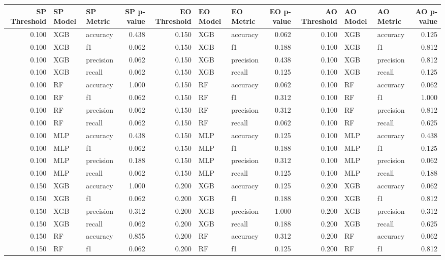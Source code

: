 \begin{tabular}{rllrrllrrllr}
\toprule
SP Threshold & SP Model & SP Metric & SP p-value & EO Threshold & EO Model & EO Metric & EO p-value & AO Threshold & AO Model & AO Metric & AO p-value \\
\midrule
0.100 & XGB & accuracy & 0.438 & 0.150 & XGB & accuracy & 0.062 & 0.100 & XGB & accuracy & 0.125 \\
0.100 & XGB & f1 & 0.062 & 0.150 & XGB & f1 & 0.188 & 0.100 & XGB & f1 & 0.812 \\
0.100 & XGB & precision & 0.062 & 0.150 & XGB & precision & 0.438 & 0.100 & XGB & precision & 0.812 \\
0.100 & XGB & recall & 0.062 & 0.150 & XGB & recall & 0.125 & 0.100 & XGB & recall & 0.125 \\
0.100 & RF & accuracy & 1.000 & 0.150 & RF & accuracy & 0.062 & 0.100 & RF & accuracy & 0.062 \\
0.100 & RF & f1 & 0.062 & 0.150 & RF & f1 & 0.312 & 0.100 & RF & f1 & 1.000 \\
0.100 & RF & precision & 0.062 & 0.150 & RF & precision & 0.312 & 0.100 & RF & precision & 0.812 \\
0.100 & RF & recall & 0.062 & 0.150 & RF & recall & 0.062 & 0.100 & RF & recall & 0.625 \\
0.100 & MLP & accuracy & 0.438 & 0.150 & MLP & accuracy & 0.125 & 0.100 & MLP & accuracy & 0.438 \\
0.100 & MLP & f1 & 0.062 & 0.150 & MLP & f1 & 0.188 & 0.100 & MLP & f1 & 0.125 \\
0.100 & MLP & precision & 0.188 & 0.150 & MLP & precision & 0.312 & 0.100 & MLP & precision & 0.062 \\
0.100 & MLP & recall & 0.062 & 0.150 & MLP & recall & 0.125 & 0.100 & MLP & recall & 0.188 \\
0.150 & XGB & accuracy & 1.000 & 0.200 & XGB & accuracy & 0.125 & 0.200 & XGB & accuracy & 0.062 \\
0.150 & XGB & f1 & 0.062 & 0.200 & XGB & f1 & 0.188 & 0.200 & XGB & f1 & 0.812 \\
0.150 & XGB & precision & 0.312 & 0.200 & XGB & precision & 1.000 & 0.200 & XGB & precision & 0.312 \\
0.150 & XGB & recall & 0.062 & 0.200 & XGB & recall & 0.188 & 0.200 & XGB & recall & 0.625 \\
0.150 & RF & accuracy & 0.855 & 0.200 & RF & accuracy & 0.312 & 0.200 & RF & accuracy & 0.062 \\
0.150 & RF & f1 & 0.062 & 0.200 & RF & f1 & 0.125 & 0.200 & RF & f1 & 0.812 \\

\end{tabular}

